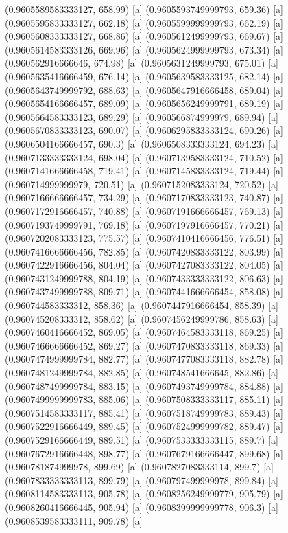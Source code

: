{{{(0.9605589583333127, 658.99) [a] 
(0.9605593749999793, 659.36) [a] 
(0.9605595833333127, 662.18) [a] 
(0.9605599999999793, 662.19) [a] 
(0.9605608333333127, 668.86) [a] 
(0.9605612499999793, 669.67) [a] 
(0.9605614583333126, 669.96) [a] 
(0.9605624999999793, 673.34) [a] 
(0.960562916666646, 674.98) [a] 
(0.9605631249999793, 675.01) [a] 
(0.9605635416666459, 676.14) [a] 
(0.9605639583333125, 682.14) [a] 
(0.9605643749999792, 688.63) [a] 
(0.9605647916666458, 689.04) [a] 
(0.9605654166666457, 689.09) [a] 
(0.9605656249999791, 689.19) [a] 
(0.9605664583333123, 689.29) [a] 
(0.960566874999979, 689.94) [a] 
(0.9605670833333123, 690.07) [a] 
(0.9606295833333124, 690.26) [a] 
(0.9606504166666457, 690.3) [a] 
(0.9606508333333124, 694.23) [a] 
(0.9607133333333124, 698.04) [a] 
(0.9607139583333124, 710.52) [a] 
(0.9607141666666458, 719.41) [a] 
(0.9607145833333124, 719.44) [a] 
(0.960714999999979, 720.51) [a] 
(0.9607152083333124, 720.52) [a] 
(0.9607166666666457, 734.29) [a] 
(0.9607170833333123, 740.87) [a] 
(0.9607172916666457, 740.88) [a] 
(0.9607191666666457, 769.13) [a] 
(0.9607193749999791, 769.18) [a] 
(0.9607197916666457, 770.21) [a] 
(0.9607202083333123, 775.57) [a] 
(0.9607410416666456, 776.51) [a] 
(0.9607416666666456, 782.85) [a] 
(0.9607420833333122, 803.99) [a] 
(0.9607422916666456, 804.04) [a] 
(0.9607427083333122, 804.05) [a] 
(0.9607431249999788, 804.19) [a] 
(0.9607433333333122, 806.63) [a] 
(0.9607437499999788, 809.71) [a] 
(0.9607441666666454, 858.08) [a] 
(0.960744583333312, 858.36) [a] 
(0.9607447916666454, 858.39) [a] 
(0.960745208333312, 858.62) [a] 
(0.9607456249999786, 858.63) [a] 
(0.9607460416666452, 869.05) [a] 
(0.9607464583333118, 869.25) [a] 
(0.9607466666666452, 869.27) [a] 
(0.9607470833333118, 869.33) [a] 
(0.9607474999999784, 882.77) [a] 
(0.9607477083333118, 882.78) [a] 
(0.9607481249999784, 882.85) [a] 
(0.960748541666645, 882.86) [a] 
(0.9607487499999784, 883.15) [a] 
(0.9607493749999784, 884.88) [a] 
(0.9607499999999783, 885.06) [a] 
(0.9607508333333117, 885.11) [a] 
(0.9607514583333117, 885.41) [a] 
(0.9607518749999783, 889.43) [a] 
(0.9607522916666449, 889.45) [a] 
(0.9607524999999782, 889.47) [a] 
(0.9607529166666449, 889.51) [a] 
(0.9607533333333115, 889.7) [a] 
(0.9607672916666448, 898.77) [a] 
(0.9607679166666447, 899.68) [a] 
(0.960781874999978, 899.69) [a] 
(0.9607827083333114, 899.7) [a] 
(0.9607833333333113, 899.79) [a] 
(0.960797499999978, 899.84) [a] 
(0.9608114583333113, 905.78) [a] 
(0.9608256249999779, 905.79) [a] 
(0.9608260416666445, 905.94) [a] 
(0.9608399999999778, 906.3) [a] 
(0.9608539583333111, 909.78) [a] 
}}}
